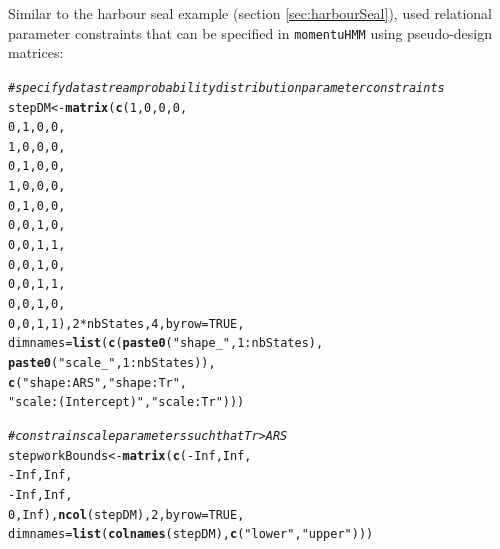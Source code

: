 \documentclass[12pt]{article}\usepackage[]{graphicx}\usepackage[]{xcolor}
\makeatletter
\newcommand{\hlnum}[1]{\textcolor[rgb]{0.686,0.059,0.569}{#1}}%
\newcommand{\hlsng}[1]{\textcolor[rgb]{0.192,0.494,0.8}{#1}}%
\newcommand{\hlcom}[1]{\textcolor[rgb]{0.678,0.584,0.686}{\textit{#1}}}%
\newcommand{\hlopt}[1]{\textcolor[rgb]{0,0,0}{#1}}%
\newcommand{\hldef}[1]{\textcolor[rgb]{0.345,0.345,0.345}{#1}}%
\newcommand{\hlkwb}[1]{\textcolor[rgb]{0.69,0.353,0.396}{#1}}%
\newcommand{\hlkwc}[1]{\textcolor[rgb]{0.333,0.667,0.333}{#1}}%
\newcommand{\hlkwd}[1]{\textcolor[rgb]{0.737,0.353,0.396}{\textbf{#1}}}%
\newenvironment{kframe}{%
 \def\at@end@of@kframe{}%
 \ifinner\ifhmode%
  \def\at@end@of@kframe{\end{minipage}}%
  \begin{minipage}{\columnwidth}%
 \fi\fi%
 \def\FrameCommand##1{\hskip\@totalleftmargin \hskip-\fboxsep
 \colorbox{shadecolor}{##1}\hskip-\fboxsep
     \hskip-\linewidth \hskip-\@totalleftmargin \hskip\columnwidth}%
 \MakeFramed {\advance\hsize-\width
   \@totalleftmargin\z@ \linewidth\hsize
   \@setminipage}}%
 {\par\unskip\endMakeFramed%
 \at@end@of@kframe}
\newenvironment{knitrout}{}{} %
\makeatother
\begin{document}
Similar to the harbour seal example (section \ref{sec:harbourSeal}), \cite{PirottaEtAl2018} used relational parameter constraints that can be specified in \verb|momentuHMM| using pseudo-design matrices:
\begin{knitrout}
\color{fgcolor}\begin{kframe}
\begin{alltt}
\hlcom{# specify data stream probability distribution parameter constraints}
\hldef{stepDM} \hlkwb{<-} \hlkwd{matrix}\hldef{(}\hlkwd{c}\hldef{(}\hlnum{1}\hldef{,}\hlnum{0}\hldef{,}\hlnum{0}\hldef{,}\hlnum{0}\hldef{,}
                   \hlnum{0}\hldef{,}\hlnum{1}\hldef{,}\hlnum{0}\hldef{,}\hlnum{0}\hldef{,}
                   \hlnum{1}\hldef{,}\hlnum{0}\hldef{,}\hlnum{0}\hldef{,}\hlnum{0}\hldef{,}
                   \hlnum{0}\hldef{,}\hlnum{1}\hldef{,}\hlnum{0}\hldef{,}\hlnum{0}\hldef{,}
                   \hlnum{1}\hldef{,}\hlnum{0}\hldef{,}\hlnum{0}\hldef{,}\hlnum{0}\hldef{,}
                   \hlnum{0}\hldef{,}\hlnum{1}\hldef{,}\hlnum{0}\hldef{,}\hlnum{0}\hldef{,}
                   \hlnum{0}\hldef{,}\hlnum{0}\hldef{,}\hlnum{1}\hldef{,}\hlnum{0}\hldef{,}
                   \hlnum{0}\hldef{,}\hlnum{0}\hldef{,}\hlnum{1}\hldef{,}\hlnum{1}\hldef{,}
                   \hlnum{0}\hldef{,}\hlnum{0}\hldef{,}\hlnum{1}\hldef{,}\hlnum{0}\hldef{,}
                   \hlnum{0}\hldef{,}\hlnum{0}\hldef{,}\hlnum{1}\hldef{,}\hlnum{1}\hldef{,}
                   \hlnum{0}\hldef{,}\hlnum{0}\hldef{,}\hlnum{1}\hldef{,}\hlnum{0}\hldef{,}
                   \hlnum{0}\hldef{,}\hlnum{0}\hldef{,}\hlnum{1}\hldef{,}\hlnum{1}\hldef{),}\hlnum{2}\hlopt{*}\hldef{nbStates,}\hlnum{4}\hldef{,}\hlkwc{byrow}\hldef{=}\hlnum{TRUE}\hldef{,}
                 \hlkwc{dimnames}\hldef{=}\hlkwd{list}\hldef{(}\hlkwd{c}\hldef{(}\hlkwd{paste0}\hldef{(}\hlsng{"shape_"}\hldef{,}\hlnum{1}\hlopt{:}\hldef{nbStates),}
                                 \hlkwd{paste0}\hldef{(}\hlsng{"scale_"}\hldef{,}\hlnum{1}\hlopt{:}\hldef{nbStates)),}
                               \hlkwd{c}\hldef{(}\hlsng{"shape:ARS"}\hldef{,}\hlsng{"shape:Tr"}\hldef{,}
                                 \hlsng{"scale:(Intercept)"}\hldef{,}\hlsng{"scale:Tr"}\hldef{)))}

\hlcom{# constrain scale parameters such that Tr > ARS }
\hldef{stepworkBounds} \hlkwb{<-} \hlkwd{matrix}\hldef{(}\hlkwd{c}\hldef{(}\hlopt{-}\hlnum{Inf}\hldef{,}\hlnum{Inf}\hldef{,}
                           \hlopt{-}\hlnum{Inf}\hldef{,}\hlnum{Inf}\hldef{,}
                           \hlopt{-}\hlnum{Inf}\hldef{,}\hlnum{Inf}\hldef{,}
                           \hlnum{0}\hldef{,}\hlnum{Inf}\hldef{),}\hlkwd{ncol}\hldef{(stepDM),}\hlnum{2}\hldef{,}\hlkwc{byrow}\hldef{=}\hlnum{TRUE}\hldef{,}
                         \hlkwc{dimnames}\hldef{=}\hlkwd{list}\hldef{(}\hlkwd{colnames}\hldef{(stepDM),}\hlkwd{c}\hldef{(}\hlsng{"lower"}\hldef{,}\hlsng{"upper"}\hldef{)))}


\end{alltt}
\end{kframe}
\end{knitrout}
\end{document}

